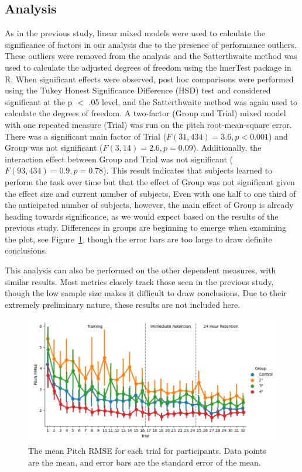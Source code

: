 \subsection{Analysis}

As in the previous study, linear mixed models were used to calculate the significance of factors in our analysis due to the presence of performance outliers.
These outliers were removed from the analysis and the Satterthwaite method was used to calculate the adjusted degrees of freedom using the lmerTest package in R.
When significant effects were observed, post hoc comparisons were performed using the Tukey Honest Significance Difference (HSD) test and considered significant at the p $<$ .05 level, and the Satterthwaite method was again used to calculate the degrees of freedom.
A two-factor (Group and Trial) mixed model with one repeated measure (Trial) was run on the pitch root-mean-square error.
There was a significant main factor of Trial ($F(31, 434) = 3.6, p < 0.001$) and Group was not significant ($F(3, 14) = 2.6, p = 0.09$).
Additionally, the interaction effect between Group and Trial was not significant ($F(93, 434) = 0.9, p = 0.78$).
This result indicates that subjects learned to perform the task over time but that the effect of Group was not significant given the effect size and current number of subjects.
Even with one half to one third of the anticipated number of subjects, however, the main effect of Group is already heading towards significance, as we would expect based on the results of the previous study.
Differences in groups are beginning to emerge when examining the plot, see Figure~\ref{figure-bw:pitchrmse}, though the error bars are too large to draw definite conclusions.

This analysis can also be performed on the other dependent measures, with similar results.
Most metrics closely track those seen in the previous study, though the low sample size makes it difficult to draw conclusions.
Due to their extremely preliminary nature, these results are not included here.

\begin{figure}[tb!]
    \begin{center}
        \includegraphics[width=\linewidth]{figures/Aircraft/Bandwidth-PitchRMSE.png}
        \caption[The mean Pitch RMSE for each trial]{The mean Pitch RMSE for each trial for participants. Data points are the mean, and error bars are the standard error of the mean.}
        \label{figure-bw:pitchrmse}
    \end{center}
\end{figure}

